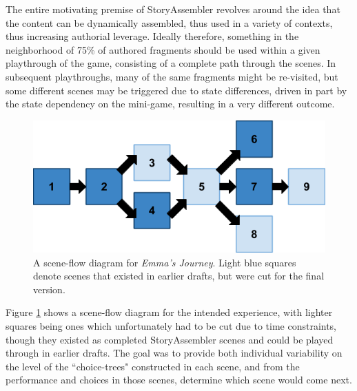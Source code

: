 The entire motivating premise of StoryAssembler revolves around the idea that the content can be dynamically assembled, thus used in a variety of contexts, thus increasing authorial leverage. Ideally therefore, something in the neighborhood of 75\% of authored fragments should be used within a given playthrough of the game, consisting of a complete path through the scenes. In subsequent playthroughs, many of the same fragments might be re-visited, but some different scenes may be triggered due to state differences, driven in part by the state dependency on the mini-game, resulting in a very different outcome.


\begin{figure}
    \centering
    \includegraphics[width=\textwidth]{figures/3-StoryAssembler/plot-diagram.png}
    \caption{A scene-flow diagram for \textit{Emma's Journey}. Light blue squares denote scenes that existed in earlier drafts, but were cut for the final version.}
    \label{fig:plot-diagram}
\end{figure}


Figure \ref{fig:plot-diagram} shows a scene-flow diagram for the intended experience, with lighter squares being ones which unfortunately had to be cut due to time constraints, though they existed as completed StoryAssembler scenes and could be played through in earlier drafts. The goal was to provide both individual variability on the level of the ``choice-trees" constructed in each scene, and from the performance and choices in those scenes, determine which scene would come next.

